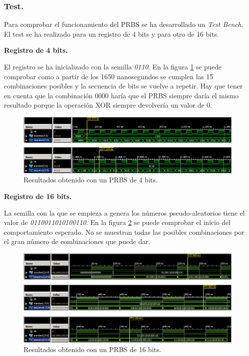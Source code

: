 \documentclass{article}
\begin{document}
\subsubsection{Test.}

	Para comprobar el funcionamiento del PRBS se ha desarrollado un \emph{Test Bench}. El test se ha realizado para un registro de 4 bits y para otro de 16 bits.

	\vspace{0.5cm} %
	\textbf{Registro de 4 bits.}

	El registro se ha inicializado con la semilla \emph{0110}. En la figura \ref{fig:p5a:tb_4bits} se puede comprobar como a partir de los 1650 nanosegundos se cumplen las 15 combinaciones posibles y la secuencia de bits se vuelve a repetir. Hay que tener en cuenta que la combinación 0000 haría que el PRBS siempre daría el mismo resultado porque la operación XOR siempre devolvería un valor de 0.
	
\begin{figure}[h]
  \centering
    \includegraphics[width=1\textwidth]{img/p5a_tb_4bits.png}
  \caption{Resultados obtenido con un PRBS de 4 bits.}
  \label{fig:p5a:tb_4bits}
\end{figure}

	\vspace{0.5cm} %
	\textbf{Registro de 16 bits.}
	
	La semilla con la que se empieza a genera los números pseudo-aleatorios tiene el valor de \emph{0110011010100110}. En la figura \ref{fig:p5a:tb_16bits} se puede comprobar el inicio del comportamiento esperado. No se muestran todas las posibles combinaciones por el gran número de combinaciones que puede dar.

\begin{figure}[h]
  \centering
    \includegraphics[width=1\textwidth]{img/p5a_tb_16bits.png}
  \caption{Resultados obtenido con un PRBS de 16 bits.}
  \label{fig:p5a:tb_16bits}
\end{figure}
\end{document}

